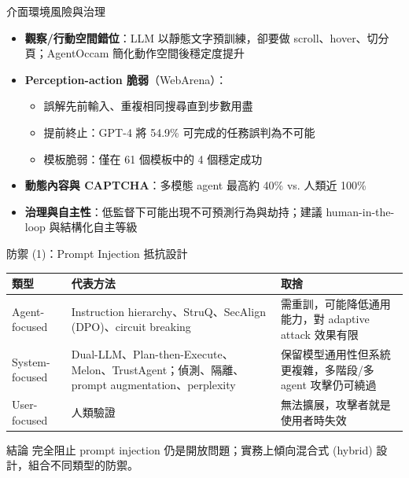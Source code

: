 \documentclass[aspectratio=169]{beamer}
\newcommand{\tabsetup}{\renewcommand{\arraystretch}{1.18}}
\begin{document}
\begin{frame}{介面環境風險與治理}
    \small
    \begin{itemize}
        \item \textbf{觀察/行動空間錯位}：LLM 以靜態文字預訓練，卻要做 scroll、hover、切分頁；AgentOccam 簡化動作空間後穩定度提升
        \item \textbf{Perception-action 脆弱}（WebArena）：
        \begin{itemize}
            \item 誤解先前輸入、重複相同搜尋直到步數用盡
            \item 提前終止：GPT-4 將 54.9\% 可完成的任務誤判為不可能
            \item 模板脆弱：僅在 61 個模板中的 4 個穩定成功
        \end{itemize}
        \item \textbf{動態內容與 CAPTCHA}：多模態 agent 最高約 40\% vs. 人類近 100\%
        \item \textbf{治理與自主性}：低監督下可能出現不可預測行為與劫持；建議 human-in-the-loop 與結構化自主等級
    \end{itemize}
\end{frame}


\begin{frame}{防禦 (1)：Prompt Injection 抵抗設計}
    \tabsetup
    \footnotesize
    \begin{table}
        \centering
        \begin{tabular}{@{}l p{4.6cm} p{4.6cm}@{}}
            \toprule
            類型 & 代表方法 & 取捨 \\
            \midrule
            Agent-focused & Instruction hierarchy、StruQ、SecAlign (DPO)、circuit breaking & 需重訓，可能降低通用能力，對 adaptive attack 效果有限 \\
            System-focused & Dual-LLM、Plan-then-Execute、Melon、TrustAgent；偵測、隔離、prompt augmentation、perplexity & 保留模型通用性但系統更複雜，多階段/多 agent 攻擊仍可繞過 \\
            User-focused & 人類驗證 & 無法擴展，攻擊者就是使用者時失效 \\
            \bottomrule
        \end{tabular}
    \end{table}

    \begin{block}{結論}
        完全阻止 prompt injection 仍是開放問題；實務上傾向\alert{混合式 (hybrid) 設計}，組合不同類型的防禦。
    \end{block}
\end{frame}
\end{document}
